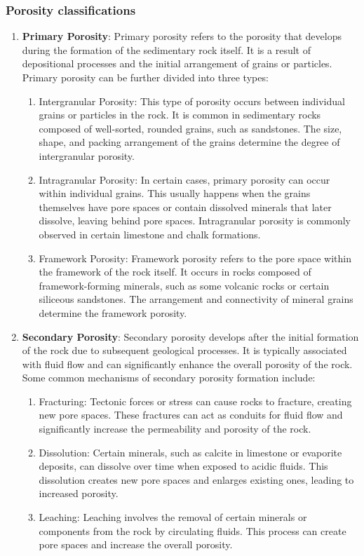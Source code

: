 \documentclass{article}
\begin{document}
\subsubsection*{Porosity classifications}
\begin{enumerate}
    \item \textbf{Primary Porosity}:
    Primary porosity refers to the porosity that develops during the formation of the sedimentary rock itself. It is a result of depositional processes and the initial arrangement of grains or particles. Primary porosity can be further divided into three types:
    \begin{enumerate}
        \item Intergranular Porosity: This type of porosity occurs between individual grains or particles in the rock. It is common in sedimentary rocks composed of well-sorted, rounded grains, such as sandstones. The size, shape, and packing arrangement of the grains determine the degree of intergranular porosity.
        \item Intragranular Porosity: In certain cases, primary porosity can occur within individual grains. This usually happens when the grains themselves have pore spaces or contain dissolved minerals that later dissolve, leaving behind pore spaces. Intragranular porosity is commonly observed in certain limestone and chalk formations.
        \item Framework Porosity: Framework porosity refers to the pore space within the framework of the rock itself. It occurs in rocks composed of framework-forming minerals, such as some volcanic rocks or certain siliceous sandstones. The arrangement and connectivity of mineral grains determine the framework porosity.
    \end{enumerate}
    
    \item \textbf{Secondary Porosity}:
    Secondary porosity develops after the initial formation of the rock due to subsequent geological processes. It is typically associated with fluid flow and can significantly enhance the overall porosity of the rock. Some common mechanisms of secondary porosity formation include:
    \begin{enumerate}
        \item Fracturing: Tectonic forces or stress can cause rocks to fracture, creating new pore spaces. These fractures can act as conduits for fluid flow and significantly increase the permeability and porosity of the rock.
        \item Dissolution: Certain minerals, such as calcite in limestone or evaporite deposits, can dissolve over time when exposed to acidic fluids. This dissolution creates new pore spaces and enlarges existing ones, leading to increased porosity.
        \item Leaching: Leaching involves the removal of certain minerals or components from the rock by circulating fluids. This process can create pore spaces and increase the overall porosity.
    \end{enumerate}
\end{enumerate}
\end{document}
